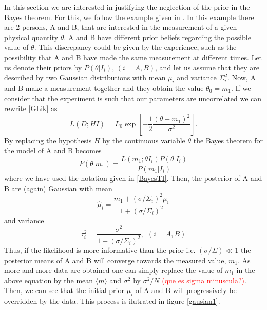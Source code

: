 \documentclass[onecolumn,           %
               showpacs,            %
               preprintnumbers,     %
               aps,                 %
               prl,          	    %
               letterpaper,             %
               superscriptaddress,      %
               nofootinbib,         %
               tightenlines,        %
               floats,floatfix      %
               ,usenatbib,
               ]{revtex4-1}
\begin{document}
In this section we are interested in justifying the neglection of the prior in the Bayes theorem. For this, we follow the example given in \cite{RobT}. In this example there are 2 persons, A and B, that are interested in the measurement of a given physical quantity $\theta$. A and B have different prior beliefs regarding the possible value of $\theta$. This discrepancy could be given by the experience, such as the possibility that A and B have made the same measurement at different times. Let us denote their priors by $P(\theta|I_i)$, $(i=A,B)$, and let us assume that they are described by two Gaussian distributions with mean $\mu_i$ and variance $\Sigma_i^2$. Now, A and B make a measurement together and they obtain the value $\theta_0=m_1$. If we consider that the experiment is such that our parameters are uncorrelated we can rewrite \eqref{GLik} as
\begin{equation}\label{LikG}
L(D;HI)=L_0\exp\left[-\frac{1}{2}\frac{(\theta-m_1)^2}{\sigma^2}\right].
\end{equation}
By replacing the hypothesis $H$ by the continuous variable $\theta$ the Bayes theorem for the model of A and B becomes
\begin{equation}
P(\theta|m_1)=\frac{L(m_1;\theta I_i)P(\theta|I_i)}{P(m_1|I_i)}
\end{equation}
where we have used the notation given in \eqref{BayesTI}. Then, the posterior of A and B are (again) Gaussian with mean
\begin{equation}
\hat \mu_i = \frac{m_1+(\sigma/\Sigma_i)^2\mu_i}{1+(\sigma/\Sigma_i)^2}
\end{equation}
and variance 
\begin{equation}
\tau_i^2=\frac{\sigma^2}{1+(\sigma/\Sigma_i)^2}, \ \ (i=A,B)
\end{equation}
Thus, if the likelihood is more informative than the prior i.e. $(\sigma/\Sigma)\ll 1$ the posterior means of A and B will converge towards the measured value, $m_1$. As more and more data are obtained one can simply replace the value of $m_1$ in the above equation by the mean $\langle m\rangle$ and $\sigma^2$ by $\sigma^2/N$ \textcolor{red}{(que es sigma minuscula?)}. Then, we can see that the initial prior $\mu_i$ of A and B will progressively be overridden by the data. This process is ilutrated in figure \ref{gausian1}.
\end{document}
